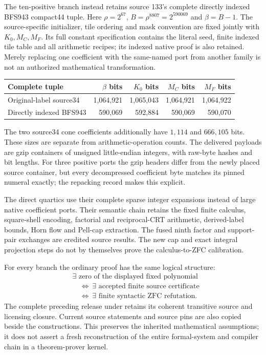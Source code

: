 \documentclass[11pt]{article}
\begin{document}
The ten-positive branch instead retains source 133's complete directly indexed
BFS943 compact44 tuple. Here $\rho=2^{67}$,
$B=\rho^{8807}=2^{590069}$ and $\beta=B-1$.
The source-specific initializer, tile ordering and mask convention are fixed
jointly with $K_0,M_C,M_F$. Its full constant specification contains the literal
seed, finite indexed tile table and all arithmetic recipes; its indexed native
proof is also retained. Merely replacing one coefficient with the same-named
port from another family is not an authorized mathematical transformation.

\begin{center}\small
\begin{tabular}{lrrrr}
\toprule
Complete tuple & $\beta$ bits & $K_0$ bits & $M_C$ bits & $M_F$ bits\\
\midrule
Original-label source34 &1,064,921&1,065,043&1,064,921&1,064,922\\
Directly indexed BFS943 &590,069&592,884&590,069&590,070\\
\bottomrule
\end{tabular}
\end{center}
The two source34 cone coefficients additionally have $1,114$ and $666,105$
bits. These sizes are separate from arithmetic-operation counts. The delivered
payloads are gzip containers of unsigned little-endian integers, with raw-byte
hashes and bit lengths. For three positive ports the gzip headers differ from
the newly placed source container, but every decompressed coefficient byte
matches its pinned numeral exactly; the repacking record makes this explicit.

The direct quartics use their complete sparse integer expansions instead of
large native coefficient ports. Their semantic chain retains the fixed finite
calculus, square-shell encoding, factorial and reciprocal-CRT arithmetic,
derived-label bounds, Horn flow and Pell-cap extraction. The fused ninth
factor and support-pair exchanges are credited source results. The new cap
and exact integral projection steps do not by themselves prove the
calculus-to-ZFC calibration.

For every branch the ordinary proof has the same logical structure:
\[
\begin{aligned}
 &\exists\text{ zero of the displayed fixed polynomial}\\
 &\quad\Longleftrightarrow\ \exists\text{ accepted finite source certificate}\\
 &\quad\Longleftrightarrow\ \exists\text{ finite syntactic ZFC refutation}.
\end{aligned}
\]
The complete preceding release under  retains its coherent
transitive source and licensing closure. Current source statements and source
pins are also copied beside the constructions. This preserves the inherited
mathematical assumptions; it does not assert a fresh reconstruction of the
entire formal-system and compiler chain in a theorem-prover kernel.
\end{document}
